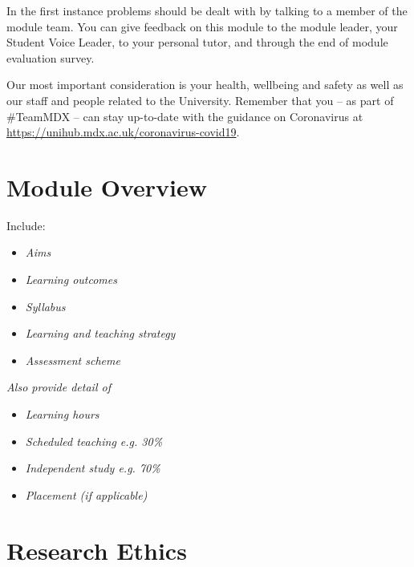 \documentclass{MDXHandbook}
\begin{document}
In the first instance problems should be dealt with by talking to a member of the module team. You can give feedback on this module to the module leader, your Student Voice Leader, to your personal tutor, and through the end of module evaluation survey.

Our most important consideration is your health, wellbeing and safety as well as our staff and people related to the University. Remember that you -- as part of \#TeamMDX -- can stay up-to-date with the guidance on Coronavirus at \url{https://unihub.mdx.ac.uk/coronavirus-covid19}.


\section{Module Overview}
Include:
\begin{itemize}
\item \emph{Aims}
\item \emph{Learning outcomes}
\item \emph{Syllabus}
\item \emph{Learning and teaching strategy}
\item \emph{Assessment scheme}
\end{itemize}

\emph{Also provide detail of}
\begin{itemize}
\item \emph{Learning hours}
\item \emph{Scheduled teaching  e.g. 30\%}
\item \emph{Independent study e.g. 70\%}
\item \emph{Placement (if applicable)}
\end{itemize}

\section*{Research Ethics}
\end{document}
